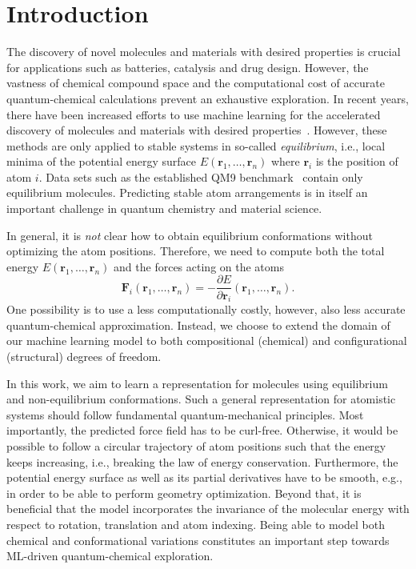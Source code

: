 \documentclass{article}
\newcommand{\rr}{\mathbf{r}}
\begin{document}
\section{Introduction}

The discovery of novel molecules and materials with desired properties is crucial for applications such as batteries, catalysis and drug design.
However, the vastness of chemical compound space and the computational cost of accurate quantum-chemical calculations prevent an exhaustive exploration.
In recent years, there have been increased efforts to use machine learning for the accelerated discovery of molecules and materials with desired properties~\citep{rupp2012fast,montavon2013machine,hansen2013assessment,schutt2014represent,Hansen-JCPL,faber2017fast,brockherde2017bypassing,boomsma2017spherical,eickenberg2017scattering}.
However, these methods are only applied to stable systems in so-called \emph{equilibrium}, i.e., local minima of the potential energy surface $E(\rr_1, \dots, \rr_n)$ where $\rr_i$ is the position of atom $i$.
Data sets such as the established QM9 benchmark~\citep{ramakrishnan2014quantum} contain only equilibrium molecules.
Predicting stable atom arrangements is in itself an important challenge in quantum chemistry and material science.

In general, it is \emph{not} clear how to obtain equilibrium conformations without optimizing the atom positions.
Therefore, we need to compute both the total energy $E(\rr_1, \dots, \rr_n)$ and the forces acting on the atoms
\begin{equation}
\textbf{F}_i (\rr_1, \dots, \rr_n) = - \frac{\partial E}{\partial \mathbf{r}_i} (\rr_1, \dots, \rr_n). \label{eq:force}
\end{equation}
One possibility is to use a less computationally costly, however, also less accurate quantum-chemical approximation.
Instead, we choose to extend the domain of our machine learning model to both compositional (chemical) and configurational (structural) degrees of freedom.

In this work, we aim to learn a representation for molecules using equilibrium and non-equilibrium conformations.
Such a general representation for atomistic systems should follow fundamental quantum-mechanical principles.
Most importantly, the predicted force field has to be curl-free.
Otherwise, it would be possible to follow a circular trajectory of atom positions such that the energy keeps increasing, i.e., breaking the law of energy conservation.
Furthermore, the potential energy surface as well as its partial derivatives have to be smooth, e.g., in order to be able to perform geometry optimization.
Beyond that, it is beneficial that the model incorporates the invariance of the molecular energy with respect to rotation, translation and atom indexing.
Being able to model both chemical and conformational variations constitutes an important step towards ML-driven quantum-chemical exploration.
\end{document}
